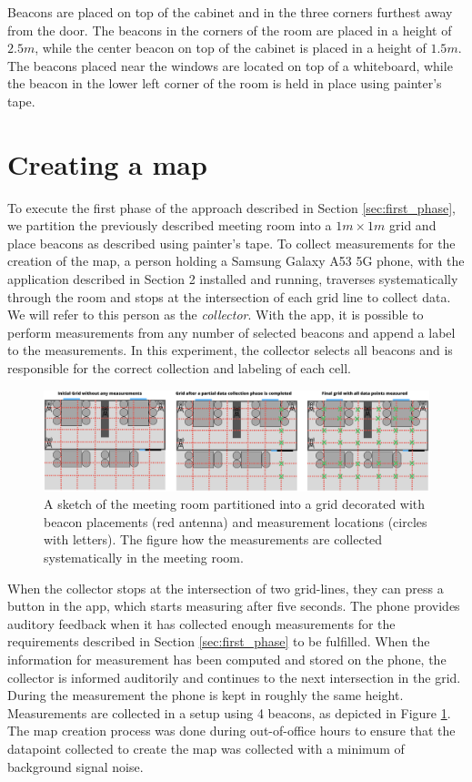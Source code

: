 Beacons are placed on top of the cabinet and in the three corners furthest away from the door. 
The beacons in the corners of the room are placed in a height of $2.5m$, while the center beacon on top of the cabinet is placed in a height of $1.5m$.   
The beacons placed near the windows are located on top of a whiteboard, while the beacon in the lower left corner of the room is held in place using painter's tape. 

\section{Creating a map}
To execute the first phase of the approach described in Section \ref{sec:first_phase},  we partition the previously described meeting room into a $1m \times 1m$ grid and place beacons as described using painter's tape.%
To collect measurements for the creation of the map, a person holding a Samsung Galaxy A53 5G phone, with the application described in Section 2 installed and running, traverses systematically through the room and stops at the intersection of each grid line to collect data. 
We will refer to this person as the \textit{collector}.
With the app, it is possible to perform measurements from any number of selected beacons and append a label to the measurements.
In this experiment, the collector selects all beacons and is responsible for the correct collection and labeling of each cell.
\begin{figure}[h]
    \centering
    \includegraphics[width=\textwidth]{images/experiment_map_creation.png}
    \caption{A sketch of the meeting room partitioned into a grid decorated with beacon placements (red antenna) and measurement locations (circles with letters). The figure how the measurements are collected systematically in the meeting room.}
    \label{fig:experiment_map_creation}
\end{figure}
When the collector stops at the intersection of two grid-lines, they can press a button in the app, which starts measuring after five seconds.
The phone provides auditory feedback when it has collected enough measurements for the requirements described in Section \ref{sec:first_phase} to be fulfilled.
When the information for measurement has been computed and stored on the phone, the collector is informed auditorily and continues to the next intersection in the grid. 
During the measurement the phone is kept in roughly the same height.
Measurements are collected in a setup using 4 beacons, as depicted in Figure \ref{fig:experiment_map_creation}.
The map creation process was done during out-of-office hours to ensure that the datapoint collected to create the map was collected with a minimum of background signal noise.  

